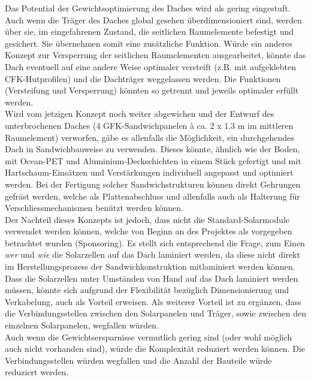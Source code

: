 Das Potential der Gewichtsoptimierung des Daches wird als gering eingestuft. Auch wenn die Träger des Daches global gesehen überdimensioniert sind, werden über sie, im eingefahrenen Zustand, die seitlichen Raumelemente befestigt und gesichert. Sie übernehmen somit eine zusätzliche Funktion. Würde ein anderes Konzept zur Versperrung der seitlichen Raumelementen ausgearbeitet, könnte das Dach eventuell auf eine andere Weise optimaler versteift (z.B. mit aufgeklebten CFK-Hutprofilen) und die Dachträger weggelassen werden. Die Funktionen (Versteifung und Versperrung) könnten so getrennt und jeweils optimaler erfüllt werden.\\
Wird vom jetzigen Konzept noch weiter abgewichen und der Entwurf des unterbrochenen Daches (4 GFK-Sandwichpanelen à ca. 2 x 1.3 m im mittleren Raumelement) verworfen, gäbe es allenfalls die Möglichkeit, ein durchgehendes Dach in Sandwichbauweise zu verwenden. Dieses könnte, ähnlich wie der Boden, mit Ocean-PET und Aluminium-Deckschichten in einem Stück gefertigt und mit Hartschaum-Einsätzen und Verstärkungen individuell angepasst und optimiert werden.
Bei der Fertigung solcher Sandwichstrukturen können direkt Gehrungen gefräst werden, welche als Plattenabschluss und allenfalls auch als Halterung für Verschliessmechanismen benützt werden können.\\
Der Nachteil dieses Konzepts ist jedoch, dass nicht die Standard-Solarmodule verwendet werden können, welche von Beginn an des Projektes als vorgegeben betrachtet wurden (Sponsoring). Es stellt sich entsprechend die Frage, zum Einen \emph{wer} und \emph{wie} die Solarzellen auf das Dach laminiert werden, da diese nicht direkt im Herstellungsprozess der Sandwichkonstruktion mitlaminiert werden können. Dass die Solarzellen unter Umständen \glqq von Hand\grqq{} auf das Dach laminiert werden müssen, könnte sich aufgrund der Flexibilität bezüglich Dimensionierung und Verkabelung, auch als Vorteil erweisen. Als weiterer Vorteil ist zu ergänzen, dass die Verbindungsstellen zwischen den Solarpanelen und Träger, sowie zwischen den einzelnen Solarpanelen, wegfallen würden.\\
Auch wenn die Gewichtsersparnisse vermutlich gering sind (oder wohl möglich auch nicht vorhanden sind), würde die Komplexität reduziert werden können. Die Verbindungsstellen würden wegfallen und die Anzahl der Bauteile würde reduziert werden.


